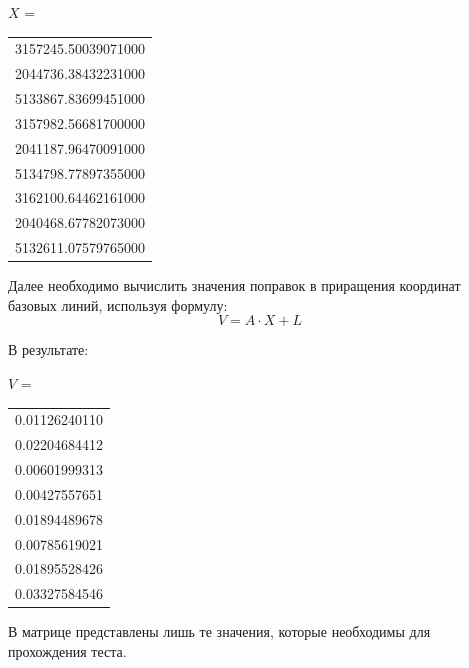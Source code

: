 \documentclass[a4paper]{article}
\begin{document}
\begin{newpage}
\begin{center}
$X$ =
\begin{tabular}{|c|}
3157245.50039071000\\
2044736.38432231000\\
5133867.83699451000\\
3157982.56681700000\\
2041187.96470091000\\
5134798.77897355000\\
3162100.64462161000\\
2040468.67782073000\\
5132611.07579765000\\
\end{tabular}
\end{center}
\par Далее необходимо вычислить значения поправок в приращения координат базовых линий, используя формулу:
\begin{equation}
    V = A\cdot X+L
\end{equation}
\par В результате:
\begin{center}
$V$ =
\begin{tabular}{|c|}
0.01126240110\\
0.02204684412\\
0.00601999313\\
0.00427557651\\
0.01894489678\\
0.00785619021\\
0.01895528426\\
0.03327584546\\
\end{tabular}
\end{center}
\par В матрице представлены лишь те значения, которые необходимы для прохождения теста.
\end{newpage}
\end{document}
